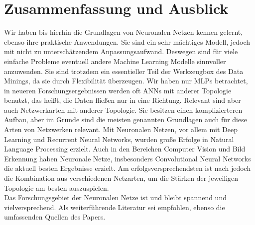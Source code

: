 \section{Zusammenfassung und Ausblick}
Wir haben bis hierhin die Grundlagen von Neuronalen Netzen kennen gelernt, ebenso ihre praktische Anwendungen. 
Sie sind ein sehr mächtiges Modell, jedoch mit nicht zu unterschätzendem Anpassungsaufwand. Deswegen sind für viele einfache Probleme eventuell andere Machine Learning Modelle sinnvoller anzuwenden. Sie sind trotzdem ein essentieller Teil der Werkzeugbox des Data Minings, da sie durch Flexibilität überzeugen. 
Wir haben nur MLPs betrachtet, in neueren Forschungsergebnissen werden oft ANNs mit anderer Topologie benutzt, das heißt, die Daten fließen nur in eine Richtung. Relevant sind aber auch Netzwerkarten mit anderer Topologie. Sie besitzen einen komplizierteren Aufbau, aber im Grunde sind die meisten genannten Grundlagen auch für diese Arten von Netzwerken relevant. 
Mit Neuronalen Netzen, vor allem mit Deep Learning und Recurrent Neural Networks, wurden große Erfolge in Natural Language Processing erzielt. Auch in den Bereichen Computer Vision und Bild Erkennung haben Neuronale Netze, insbesonders Convolutional Neural Networks die aktuell besten Ergebnisse erzielt. Am erfolgsversprechendsten ist nach \cite{LeCun2015} jedoch die Kombination aus verschiedenen Netzarten, um die Stärken der jeweiligen Topologie am besten auszuspielen. \\

Das Forschungsgebiet der Neuronalen Netze ist und bleibt spannend und vielversprechend. Als weiterführende Literatur sei \cite{LeCun2015} empfohlen, ebenso die umfassenden Quellen des Papers.


